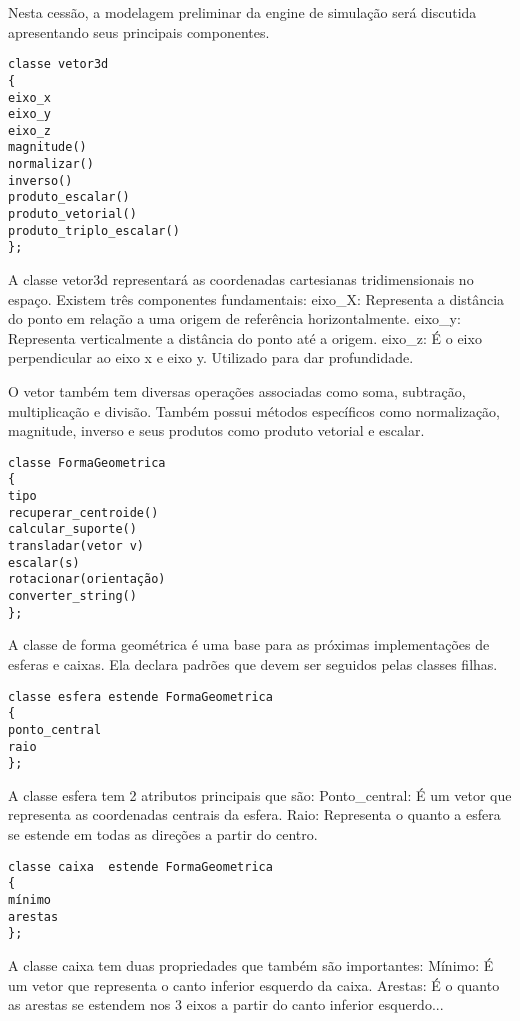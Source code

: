 Nesta cessão, a modelagem preliminar da engine de simulação será discutida apresentando seus principais componentes.

\begin{lstlisting}[frame=single,caption=Código de exemplo\label{codigo1}]
classe vetor3d
{
eixo_x
eixo_y
eixo_z
magnitude()
normalizar()
inverso()
produto_escalar()
produto_vetorial()
produto_triplo_escalar()
};
\end{lstlisting}

A classe vetor3d representará as coordenadas cartesianas tridimensionais no espaço.
Existem três componentes fundamentais:
eixo_X: Representa a distância do ponto em relação a uma origem de referência horizontalmente.
eixo_y: Representa verticalmente a distância do ponto até a origem.
eixo_z: É o eixo perpendicular ao eixo x e eixo y. Utilizado para dar profundidade.

O vetor também tem diversas operações associadas como soma, subtração,
multiplicação e divisão. Também possui métodos específicos como normalização,
magnitude, inverso e seus produtos como produto vetorial e escalar.

\begin{lstlisting}[frame=single,caption=Código de exemplo\label{codigo1}]
classe FormaGeometrica
{
tipo
recuperar_centroide()
calcular_suporte()
transladar(vetor v)
escalar(s)
rotacionar(orientação)
converter_string()
};
\end{lstlisting}

A classe de forma geométrica é uma base para as próximas implementações de
esferas e caixas.
Ela declara padrões que devem ser seguidos pelas classes filhas.

\begin{lstlisting}[frame=single,caption=Código de exemplo\label{codigo1}]
classe esfera estende FormaGeometrica
{
ponto_central
raio
};
\end{lstlisting}


A classe esfera tem 2 atributos principais que são:
Ponto_central: É um vetor que representa as coordenadas centrais da esfera.
Raio: Representa o quanto a esfera se estende em todas as direções a partir do
centro.

\begin{lstlisting}[frame=single,caption=Código de exemplo\label{codigo1}]
classe caixa  estende FormaGeometrica
{
mínimo
arestas
};
\end{lstlisting}

A classe caixa tem duas propriedades que também são importantes:
Mínimo: É um vetor que representa o canto inferior esquerdo da caixa.
Arestas: É o quanto as arestas se estendem nos 3 eixos a partir do canto
inferior esquerdo...

